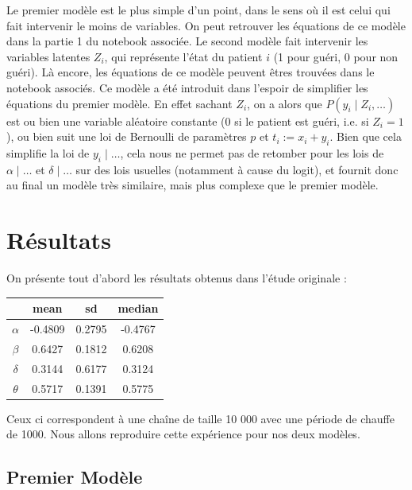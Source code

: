 Le premier modèle est le plus simple d'un point, dans le sens où il est celui qui fait intervenir le moins de variables. On peut retrouver les équations de ce modèle dans la partie 1 du notebook associée. Le second modèle fait intervenir les variables latentes $Z_i$, qui représente l'état du patient $i$ (1 pour guéri, 0 pour non guéri). Là encore, les équations de ce modèle peuvent êtres trouvées dans le notebook associés. Ce modèle a été introduit dans l'espoir de simplifier les équations du premier modèle. En effet sachant $Z_i$, on a alors que $P(y_i \mid Z_i, \dots)$ est ou bien une variable aléatoire constante (0 si le patient est guéri, i.e. si $Z_i=1$), ou bien suit une loi de Bernoulli de paramètres $p$ et $t_i := x_i + y_i$.
Bien que cela simplifie la loi de $y_i \mid \dots$, cela nous ne permet pas de retomber pour les lois de $\alpha \mid \dots$ et $\delta \mid \dots$ sur des lois usuelles (notamment à cause du logit), et fournit donc au final un modèle très similaire, mais plus complexe que le premier modèle.

\section{Résultats}

On présente tout d'abord les résultats obtenus dans l'étude originale :

\begin{center}
\begin{tabular}{c | c  c  c}
& mean & sd & median \\
\hline
$\alpha$ & -0.4809 & 0.2795 & -0.4767 \\
$\beta$ & 0.6427 & 0.1812 & 0.6208 \\
$\delta$ & 0.3144 & 0.6177 & 0.3124 \\
$\theta$ & 0.5717 & 0.1391 & 0.5775 \\
\end{tabular}
\end{center}

Ceux ci correspondent à une chaîne de taille 10 000 avec une période de chauffe de 1000. Nous allons reproduire cette expérience pour nos deux modèles.

\subsection{Premier Modèle}

